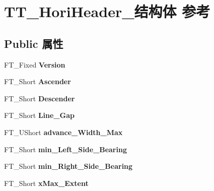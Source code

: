 \hypertarget{struct_t_t___hori_header__}{}\section{T\+T\+\_\+\+Hori\+Header\+\_\+结构体 参考}
\label{struct_t_t___hori_header__}
\subsection*{Public 属性}
\begin{DoxyCompactItemize}
\item 
\mbox{\label{struct_t_t___hori_header___a2d0967448b63db392e35b566196fef97}} 
F\+T\+\_\+\+Fixed {\bfseries Version}
\item 
\mbox{\label{struct_t_t___hori_header___a6f987c89428c93854dab06e506134249}} 
F\+T\+\_\+\+Short {\bfseries Ascender}
\item 
\mbox{\label{struct_t_t___hori_header___ad5be55a98dfaa079a2aaa462034a1512}} 
F\+T\+\_\+\+Short {\bfseries Descender}
\item 
\mbox{\label{struct_t_t___hori_header___a4165055ed05e42a2e5eed805bfe3fd7d}} 
F\+T\+\_\+\+Short {\bfseries Line\+\_\+\+Gap}
\item 
\mbox{\label{struct_t_t___hori_header___a1ddad7e4c5e6fed50c073745961814da}} 
F\+T\+\_\+\+U\+Short {\bfseries advance\+\_\+\+Width\+\_\+\+Max}
\item 
\mbox{\label{struct_t_t___hori_header___a0e2e2bf8ca0e18b610c4eae0a647fded}} 
F\+T\+\_\+\+Short {\bfseries min\+\_\+\+Left\+\_\+\+Side\+\_\+\+Bearing}
\item 
\mbox{\label{struct_t_t___hori_header___a64144cdd595e8e8de119b78539bf2fa7}} 
F\+T\+\_\+\+Short {\bfseries min\+\_\+\+Right\+\_\+\+Side\+\_\+\+Bearing}
\item 
\mbox{\label{struct_t_t___hori_header___ab483cb323f9adc9d959209a42eb19957}} 
F\+T\+\_\+\+Short {\bfseries x\+Max\+\_\+\+Extent}

\end{DoxyCompactItemize}
